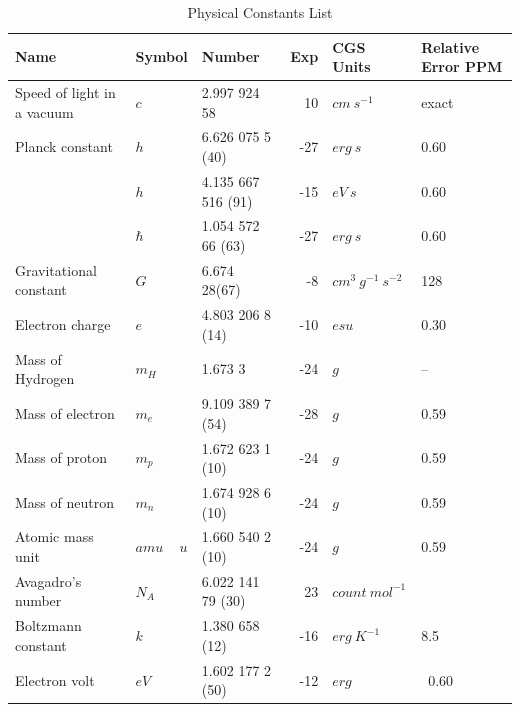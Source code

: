 
\begin{table}[!ht]
{}
{\small
\caption{Physical Constants List}
\centering
\begin{tabular}{| l | l | l | r | l | l |}
\hline
Name                       &Symbol        &Number         &Exp &CGS Units & Relative Error PPM    \\
\hline
Speed of light in a vacuum & $c$          & 2.997 924 58      &10  & $cm\ s^{-1}$ & exact    \\
Planck constant            & $h$          & 6.626 075 5 (40)  &-27 & $erg\ s$       &0.60    \\
                           & $h$          & 4.135 667 516 (91)&-15 & $eV~  s$       &0.60    \\
                           & $\hbar$      & 1.054 572 66 (63) &-27 & $erg\ s$       &0.60    \\
Gravitational constant     & $G$          & 6.674 28(67)      &-8  & $cm^{3}\ g^{-1}\ s^{-2}$ &128    \\
Electron charge            & $e$          & 4.803 206 8 (14)  &-10 & $esu$         &0.30    \\
Mass of Hydrogen           & $m_{H}$      & 1.673 3           &-24 & $g$           &--    \\
Mass of electron           & $m_{e}$      & 9.109 389 7 (54)  &-28 & $g$           &0.59    \\
Mass of proton             & $m_{p}$      & 1.672 623 1 (10)  &-24 & $g$           &0.59    \\
Mass of neutron            & $m_{n}$      & 1.674 928 6 (10)  &-24 & $g$           &0.59    \\
Atomic mass unit           & $amu$ ~ $u$  & 1.660 540 2 (10)  &-24 & $g$           &0.59    \\
Avagadro's number          & $N_A$        & 6.022 141 79 (30)  &23  & $count\ mol^{-1}$            &    \\
Boltzmann constant         & $k$          & 1.380 658 (12)    &-16 & $erg\ K^{-1}$ &8.5    \\
Electron volt              & $eV$         & 1.602 177 2 (50)  &-12 & $erg$         &~0.60    \\

\end{tabular}}
\end{table}
